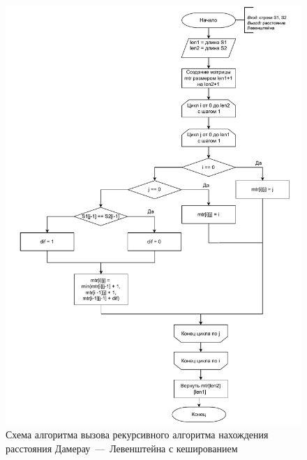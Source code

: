 \begin{figure}[h]
	\centering
	\includegraphics[height=0.9\textheight, page=4]{img/algorithms.pdf}
	\caption{Схема алгоритма вызова рекурсивного алгоритма нахождения расстояния Дамерау~---~Левенштейна с кешированием}
	\label{fig:DLrechashDecor}
\end{figure}


